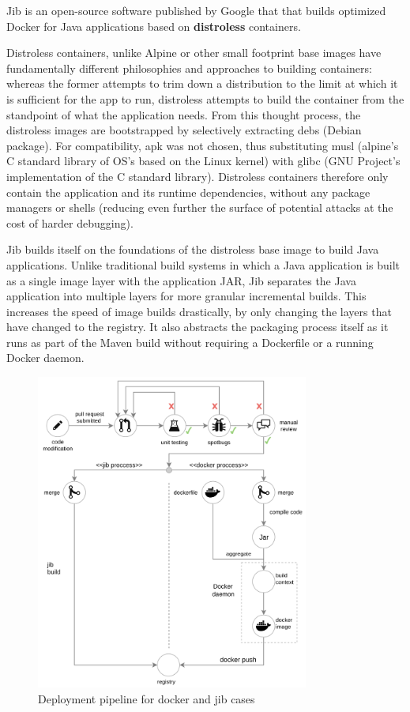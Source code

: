 \documentclass[11pt]{article}
\begin{document}

\vspace{-5mm}\hspace{5mm} Jib is an open-source software published by Google that that builds optimized Docker for Java applications based on \textbf{distroless} containers. 

Distroless containers, unlike Alpine or other small footprint base images have fundamentally different philosophies and approaches to building containers: whereas the former attempts to trim down a distribution to the limit at which it is sufficient for the app to run, distroless attempts to build the container from the standpoint of what the application needs. From this thought process, the distroless images are bootstrapped by selectively extracting debs (Debian package). For compatibility, apk was not chosen, thus substituting musl (alpine's C standard library of OS's based on the Linux kernel) with glibc (GNU Project's implementation of the C standard library). Distroless containers therefore only contain the application and its runtime dependencies, without any package managers or shells (reducing even further the surface of potential attacks at the cost of harder debugging).

Jib builds itself on the foundations of the distroless base image to build Java applications. Unlike traditional build systems in which a Java application is built as a single image layer with the application JAR, Jib separates the Java application into multiple layers for more granular incremental builds. This increases the speed of image builds drastically, by only changing the layers that have changed to the registry. It also abstracts the packaging process itself as it runs as part of the Maven build without requiring a Dockerfile or a running Docker daemon. 

\begin{figure}[!h]
    \centering
    \includegraphics[width=0.8\textwidth]{vulas_jib.png}
    \caption{Deployment pipeline for docker and jib cases}
    \label{fig:vulas_jib}
\end{figure}
\end{document}
